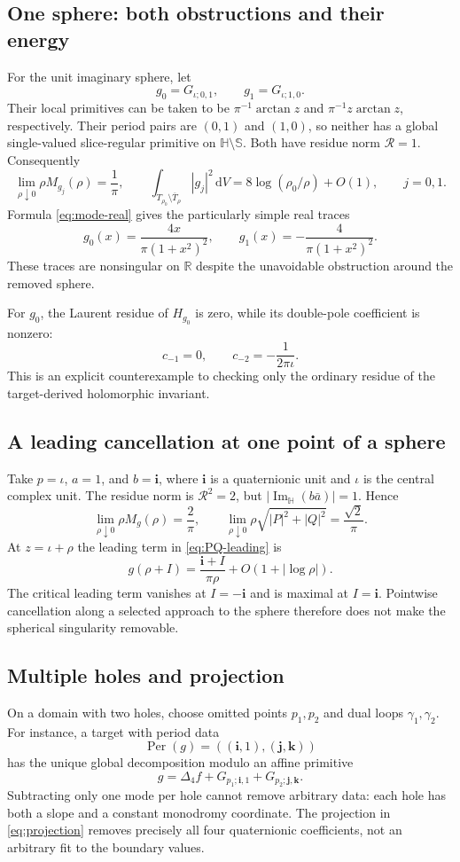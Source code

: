 \documentclass[11pt,a4paper]{article}
\numberwithin{equation}{section}
\theoremstyle{definition}
\theoremstyle{remark}
\newcommand{\R}{\mathbb R}
\newcommand{\HH}{\mathbb H}
\newcommand{\SSS}{\mathbb S}
\newcommand{\Fu}{\Delta_4}
\newcommand{\Per}{\operatorname{Per}}
\newcommand{\ImH}{\operatorname{Im}_{\HH}}
\newcommand{\dd}{\,\mathrm d}
\newcommand{\ii}{\mathbf i}
\newcommand{\jj}{\mathbf j}
\newcommand{\kk}{\mathbf k}
\begin{document}
\subsection{One sphere: both obstructions and their energy}
For the unit imaginary sphere, let
\[
 g_0=G_{\iota;0,1},\qquad g_1=G_{\iota;1,0}.
\]
Their local primitives can be taken to be
$\pi^{-1}\arctan z$ and $\pi^{-1}z\arctan z$, respectively.
Their period pairs are $(0,1)$ and $(1,0)$, so neither has a global
single-valued slice-regular primitive on $\HH\setminus\SSS$.
Both have residue norm $\mathcal R=1$. Consequently
\[
 \lim_{\rho\downarrow0}\rho M_{g_j}(\rho)=\frac1\pi,
 \qquad
 \int_{T_{\rho_0}\setminus\overline T_\rho}|g_j|^2\dd V
       =8\log(\rho_0/\rho)+O(1),\qquad j=0,1.
\]
Formula \eqref{eq:mode-real} gives the particularly simple real traces
\[
 g_0(x)=\frac{4x}{\pi(1+x^2)^2},\qquad
 g_1(x)=-\frac4{\pi(1+x^2)^2}.
\]
These traces are nonsingular on $\R$ despite the unavoidable obstruction
around the removed sphere.

For $g_0$, the Laurent residue of $H_{g_0}$ is zero, while its double-pole
coefficient is nonzero:
\[
 c_{-1}=0,\qquad c_{-2}=-\frac1{2\pi\iota}.
\]
This is an explicit counterexample to checking only the ordinary
residue of the target-derived holomorphic invariant.

\subsection{A leading cancellation at one point of a sphere}
Take $p=\iota$, $a=1$, and $b=\ii$, where $\ii$ is a quaternionic unit
and $\iota$ is the central complex unit. The residue norm is
$\mathcal R^2=2$, but $|\ImH(b\bar a)|=1$. Hence
\[
 \lim_{\rho\downarrow0}\rho M_g(\rho)=\frac2\pi,
 \qquad
 \lim_{\rho\downarrow0}\rho\sqrt{|P|^2+|Q|^2}=\frac{\sqrt2}{\pi}.
\]
At $z=\iota+\rho$ the leading term in \eqref{eq:PQ-leading} is
\[
 g(\rho+I)=\frac{\ii+I}{\pi\rho}+O(1+|\log\rho|).
\]
The critical leading term vanishes at $I=-\ii$ and is maximal at
$I=\ii$. Pointwise cancellation along a selected approach to the sphere
therefore does not make the spherical singularity removable.

\subsection{Multiple holes and projection}
On a domain with two holes, choose omitted points $p_1,p_2$ and dual
loops $\gamma_1,\gamma_2$. For instance, a target with period data
\[
 \Per(g)=((\ii,1),(\jj,\kk))
\]
has the unique global decomposition modulo an affine primitive
\[
 g=\Fu f+G_{p_1;\ii,1}+G_{p_2;\jj,\kk}.
\]
Subtracting only one mode per hole cannot remove arbitrary data: each
hole has both a slope and a constant monodromy coordinate. The
projection in \eqref{eq:projection} removes precisely all four
quaternionic coefficients, not an arbitrary fit to the boundary values.
\end{document}
